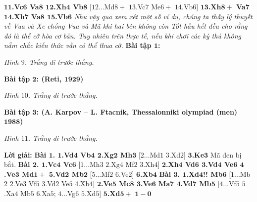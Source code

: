\begin{multicols}{2}
	\vskip 0.1cm
	\textbf{\color{gocco}$\pmb{11}$.Vc$\pmb{6}$ Va$\pmb{8}$ $\pmb{12}$.Xh$\pmb{4}$ Vb$\pmb{8}$} [$12$...Md$8+$ $13$.Vc$7$ Me$6+$ $14$.Vb$6$]
	\vskip 0.1cm
	\textbf{\color{gocco}$\pmb{13}$.Xh$\pmb{8+}$ Va$\pmb{7}$ $\pmb{14}$.Xh$\pmb{7}$ Va$\pmb{8}$ $\pmb{15}$.Vb$\pmb{6}$}
	\vskip 0.1cm
	\textit{Như vậy qua xem xét một số ví dụ, chúng ta thấy lý thuyết về Vua và Xe  chống Vua và Mã khi hai bên không còn Tốt hầu hết đều cho rằng đó là thế cờ hòa cơ bản. Tuy nhiên trên thực tế, nếu khi chơi các kỳ thủ không nắm chắc kiến thức vẫn có thể thua cờ.}
	\vskip 0.1cm
	\textbf{\color{gocco}Bài tập $\pmb{1}$:}
	\begin{center}
		\newgame
		\scalebox{0.85}\showboard
		\vskip 0.2cm
		\textit{\small\color{gocco}Hình $9$. Trắng đi trước thắng.}
	\end{center}
	\textbf{\color{gocco}Bài tập $\pmb{2}$: (Reti, $\pmb{1929}$)}
	\begin{center}
		\newgame
		\scalebox{0.85}\showboard
		\vskip 0.2cm
		\textit{\small\color{gocco}Hình $10$. Trắng đi trước thắng.}
	\end{center}
	\columnbreak
	\textbf{\color{gocco}Bài tập $\pmb{3}$: (A. Karpov -- L. Ftacnik, Thessalonniki olympiad (men) $\pmb{1988}$)}
	\begin{center}
		\newgame
		\scalebox{0.85}\showboard
		\vskip 0.2cm
		\textit{\small\color{gocco}Hình $11$. Trắng đi trước thắng.}
	\end{center}
	\textbf{\color{gocco}Lời giải:}
	\vskip 0.1cm
	\textbf{\color{gocco}Bài $\pmb{1}$.
	$\pmb{1}$.Vd$\pmb{4}$ Vb$\pmb{4}$ $\pmb{2}$.Xg$\pmb{2}$ Mh$\pmb{3}$} [$2$...Md$1$ $3$.Xd$2$]
	\vskip 0.1cm
	\textbf{\color{gocco}$\pmb{3}$.Ke$\pmb{3}$} Mã đen bị bắt.
	\vskip 0.1cm
	\textbf{\color{gocco}Bài $\pmb{2}$. 
	$\pmb{1}$.Vc$\pmb{4}$ Vc$\pmb{6}$} [$1$...Mh$3$ $2$.Xg$4$ Mf$2$ $3$.Xh$4$]
	\vskip 0.1cm
	\textbf{\color{gocco}$\pmb{2}$.Xh$\pmb{4}$ Vd$\pmb{6}$ $\pmb{3}$.Vd$\pmb{4}$ Ve$\pmb{6}$ $\pmb{4}$.Ve$\pmb{3}$ Md$\pmb{1+}$ $\pmb{5}$.Vd$\pmb{2}$ Mb$\pmb{2}$} [$5$...Mf$2$ $6$.Ve$2$]
	\vskip 0.1cm
	\textbf{\color{gocco}$\pmb{6}$.Xb$\pmb{4}$}
	\vskip 0.1cm
	\textbf{\color{gocco}Bài $\pmb{3}$.
	$\pmb{1}$.Xd$\pmb{4}$!! Mb$\pmb{6}$} [$1$...Mb$2$ $2$.Ve$3$ Vf$5$ $3$.Vd$2$ Ve$5$ $4$.Xb$4$]
	\vskip 0.1cm
	\textbf{\color{gocco}$\pmb{2}$.Ve$\pmb{5}$ Mc$\pmb{8}$ $\pmb{3}$.Ve$\pmb{6}$ Ma$\pmb{7}$ $\pmb{4}$.Vd$\pmb{7}$ Mb$\pmb{5}$} [$4$...Vf$5$ $5$.Xa$4$ Mb$5$ $6$.Xa$5$; $4$...Vg$6$ $5$.Xd$5$]
	\vskip 0.1cm
	\textbf{\color{gocco}$\pmb{5}$.Xd$\pmb{5+}$}
	\vskip 0.1cm
	$\pmb{1-0}$
	
	\vfill\null
\end{multicols}




